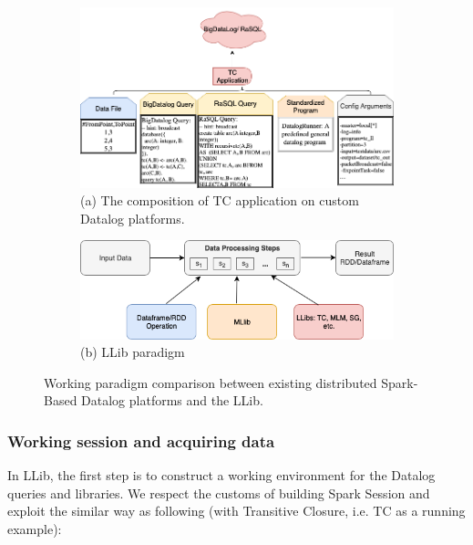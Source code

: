 \begin{figure}[!t]
	\centering
	\begin{subfigure}{0.7\textwidth}
		\centering
		\includegraphics[width=1\linewidth]{Graph/llib/datalogPipeline.png}
		\caption{\small (a) The composition of TC application on custom Datalog platforms. } 
	\end{subfigure}%
	\vspace{\floatsep}
	
	
	\begin{subfigure}{0.6\textwidth}
		\centering
		\includegraphics[width=1\linewidth]{Graph/llib/DatalogLib-4.png}
		\caption{\small(b) LLib paradigm} 
	\end{subfigure}%
	\caption{Working paradigm comparison between existing distributed Spark-Based Datalog platforms and the LLib.}\label{fig:comparison}
\end{figure}


\subsubsection{Working session and acquiring data}
\label{sec:data}
In LLib, the first step is to construct a working environment for the Datalog queries and libraries. We respect the customs of building Spark Session and exploit the similar way as following (with Transitive Closure, i.e. TC as a running example):


